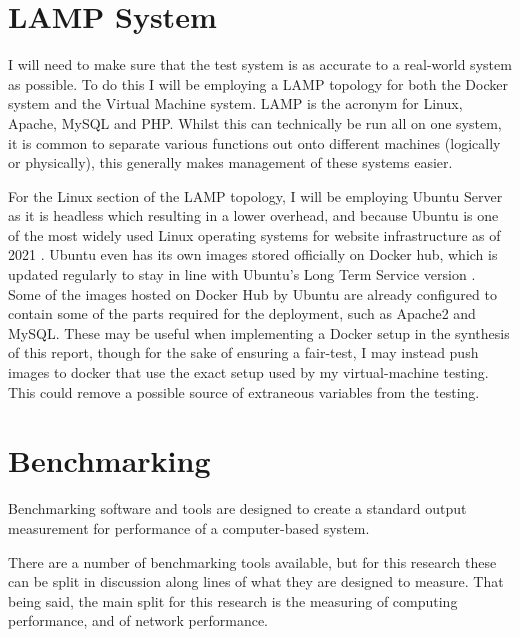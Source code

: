 \section{LAMP System}
\label{sec:LAMPsystem}
I will need to make sure that the test system is as accurate to a real-world system as possible. To do this I will be employing a LAMP topology for both the Docker system and the Virtual Machine system. LAMP is the acronym for Linux, Apache, MySQL and PHP. Whilst this can technically be run all on one system, it is common to separate various functions out onto different machines (logically or physically), this generally makes management of these systems easier.

For the Linux section of the LAMP topology, I will be employing Ubuntu Server as it is headless which resulting in a lower overhead, and because Ubuntu is one of the most widely used Linux operating systems for website infrastructure as of 2021 \citep{w3techUbuntu}. Ubuntu even has its own images stored officially on Docker hub, which is updated regularly to stay in line with Ubuntu's Long Term Service version \citep{ubuntuDocker}. Some of the images hosted on Docker Hub by Ubuntu \citep{ubuntuDockerProfile} are already configured to contain some of the parts required for the deployment, such as Apache2 and MySQL. These may be useful when implementing a Docker setup in the synthesis of this report, though for the sake of ensuring a fair-test, I may instead push images to docker that use the exact setup used by my virtual-machine testing. This could remove a possible source of extraneous variables from the testing.

\section{Benchmarking}
\label{sec:Benchmarking}
Benchmarking software and tools are designed to create a standard output measurement for performance of a computer-based system\citep{fleming1986}.

There are a  number of benchmarking tools available, but for this research these can be split in discussion along lines of what they are designed to measure. That being said, the main split for this research is the measuring of computing performance, and of network performance.

